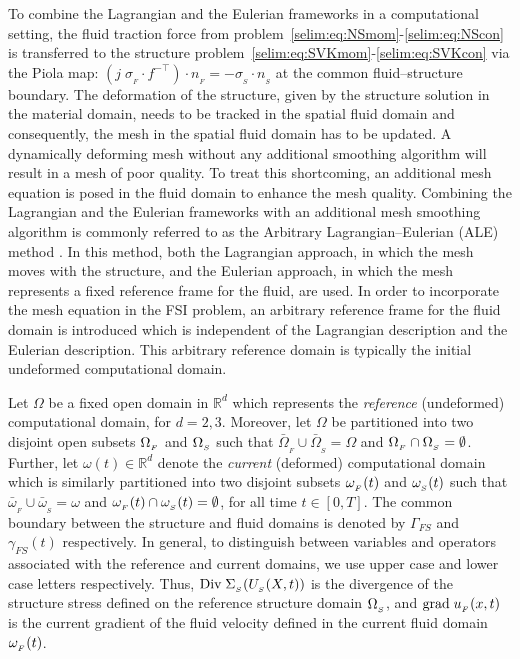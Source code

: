 To combine the Lagrangian and the Eulerian frameworks
in a computational setting, the fluid traction force from
problem~\eqref{selim:eq:NSmom}-\eqref{selim:eq:NScon} is transferred to
the structure problem~\eqref{selim:eq:SVKmom}-\eqref{selim:eq:SVKcon}
via the Piola map: $(j\;\sigma_{_{F}}\cdot f^{-\top})\cdot n_{_{F}} = -
\sigma_{_{S}}\cdot n_{_{S}}$ at the common fluid--structure boundary.
The deformation of the structure, given by the structure solution
in the material domain, needs to be tracked in the spatial fluid
domain and consequently, the mesh in the spatial fluid domain has
to be updated. A dynamically deforming mesh without any additional
smoothing algorithm will result in a mesh of poor quality. To treat
this shortcoming, an additional mesh equation is posed in the fluid
domain to enhance the mesh quality. Combining the Lagrangian and the
Eulerian frameworks with an additional mesh smoothing algorithm is
commonly referred to as the Arbitrary Lagrangian--Eulerian (ALE) method
\citep{DoneaGiulianiHalleux1982,DoneaHuertaPonthotEtAl2004}. In this
method, both the Lagrangian approach, in which the mesh moves with the
structure, and the Eulerian approach, in which the mesh represents a
fixed reference frame for the fluid, are used. In order to incorporate
the mesh equation in the FSI problem, an arbitrary reference frame for
the fluid domain is introduced which is independent of the Lagrangian
description and the Eulerian description. This arbitrary reference domain
is typically the initial undeformed computational domain.

Let $\Omega$ be a fixed open domain in $\mathbb{R}^d$ which represents
the \emph{reference} (undeformed) computational domain, for
$d=2,3$. Moreover, let $\Omega$ be partitioned into two disjoint open
subsets $\Omega_{_{F}}$ and $\Omega_{_{S}}$ such that
$\bar{\Omega}_{_{F}}\cup\bar{\Omega}_{_{S}} = \Omega$ and
$\Omega_{_{F}}\cap\Omega_{_{S}}=\emptyset$. Further, let $\omega(t)\in\mathbb{R}^d$ denote
the \emph{current} (deformed) computational domain which is similarly
partitioned into two disjoint subsets $\omega_{_{F}}(t)$ and $\omega_{_{S}}(t)$ such that
$\bar{\omega}_{_{F}}\cup\bar{\omega}_{_{S}} = \omega$ and
$\omega_{_{F}}(t)\cap\omega_{_{S}}(t)=\emptyset$, for all time $t\in[0,T]$. The common
boundary between the structure and fluid domains is denoted by
$\Gamma_{FS}$ and $\gamma_{FS}(t)$ respectively. In general, to
distinguish between variables and operators associated with the
reference and current domains, we use upper case and lower case
letters respectively. Thus, $\textrm{Div}\;\Sigma_{_{S}}(U_{_{S}}(X,t))$ is the divergence
of the structure stress defined on the reference structure domain
$\Omega_{_{S}}$, and $\textrm{grad}\;u_{_{F}}(x,t)$ is the current gradient of the fluid
velocity defined in the current fluid domain $\omega_{_{F}}(t)$.

